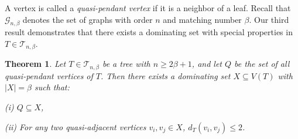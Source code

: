 \documentclass[12pt]{amsart}
\newtheorem{thm}{Theorem}[section]
\begin{document}
A vertex is called a \textit{quasi-pendant vertex} if it is a neighbor of a leaf. Recall that \(\mathcal{G}_{n,\beta}\) denotes the set of graphs with order \(n\) and matching number \(\beta\). Our third result demonstrates that there exists a dominating set with special properties in \(T \in \mathcal{T}_{n,\beta}\).

\begin{thm}\label{lem-2.8}
Let \(T \in \mathcal{T}_{n,\beta}\) be a tree with \(n \geq 2\beta + 1\), and let \(Q\) be the set of all quasi-pendant vertices of \(T\). Then there exists a dominating set \(X \subseteq V(T)\) with \(|X| = \beta\) such that:

(i) \(Q \subseteq X\),

(ii) For any two quasi-adjacent vertices \(v_i, v_j \in X\), \(d_T(v_i, v_j) \leq 2\).
\end{thm}
\end{document}
